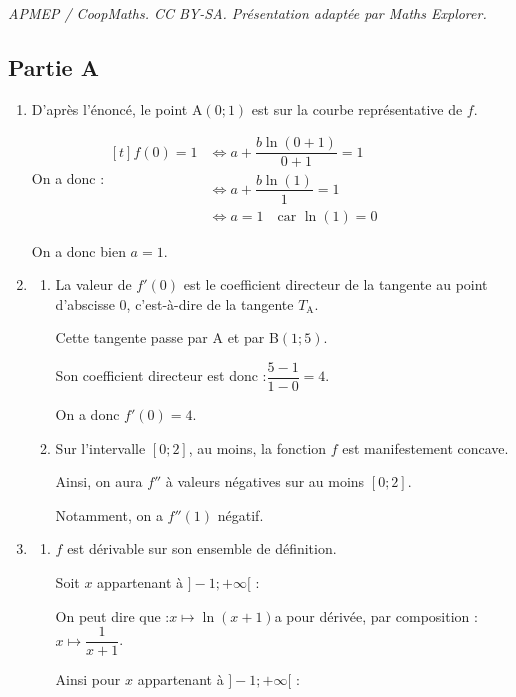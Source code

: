 \documentclass[10pt]{article}
\begin{document}
\noindent\textit{APMEP / CoopMaths. CC BY-SA. Présentation adaptée par Maths Explorer.}\par\medskip
\subsection*{Partie A}

	\begin{enumerate}
		\item D'après l'énoncé, le point A$(0 ; 1)$ est sur la courbe représentative de $f$.

		On a donc :\quad $\begin{aligned}[t]
			f(0) = 1
				&\iff a + \dfrac{b\ln(0 + 1)}{0 + 1} = 1\\
				&\iff a + \dfrac{b\ln(1)}{1}= 1\\
				&\iff a = 1 \quad \text{car } \ln(1) = 0
		\end{aligned}$

		On a donc bien $a=1$.

		\item \begin{enumerate}
			\item La valeur de $f'(0)$ est le coefficient directeur de la tangente au point d'abscisse 0, c'est-à-dire de la tangente $T_{\mathrm{A}}$.

			Cette tangente passe par A et par B$(1 ; 5)$.

			Son coefficient directeur est donc :\quad $\dfrac{5 - 1}{1 - 0} = 4$.

			On a donc $f'(0) = 4$.

			\item Sur l'intervalle $[0 ; 2]$, au moins, la fonction $f$ est manifestement concave.

			Ainsi, on aura $f''$ à valeurs négatives sur au moins $[0 ; 2]$.

			Notamment, on a $f''(1)$ négatif.
		\end{enumerate}

		\item \begin{enumerate}
			\item $f$ est dérivable sur son ensemble de définition.

			Soit $x$ appartenant à $]-1 ;+\infty[$ :

			On peut dire que :\quad $x \longmapsto \ln(x + 1)$\quad a pour dérivée, par composition : \quad $x \longmapsto \dfrac{1}{x+1}$.

			Ainsi pour $x$ appartenant à $]-1 ;+\infty[$ :


\end{enumerate}
\end{enumerate}
\end{document}
